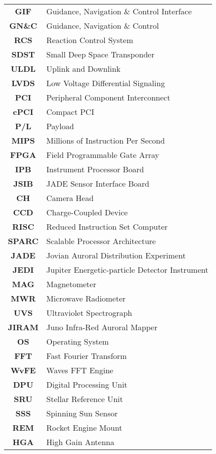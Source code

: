 \begin{multicols}{2}
{\begin{xltabular}{\linewidth}{c>{\raggedright\arraybackslash}X}
		\textbf{GIF} & Guidance, Navigation \& Control Interface \\
		\textbf{GN\&C} & Guidance, Navigation \& Control  \\
		\textbf{RCS} & Reaction Control System \\
		\textbf{SDST} & Small Deep Space Transponder \\
		\textbf{ULDL} & Uplink and Downlink \\
		\textbf{LVDS} & Low Voltage Differential Signaling \\
		\textbf{PCI} & Peripheral Component Interconnect \\
		\textbf{cPCI} & Compact PCI \\
		\textbf{P/L} & Payload \\
		\textbf{MIPS} & Millions of Instruction Per Second \\ 
		\textbf{FPGA} & Field Programmable Gate Array \\
		\textbf{IPB} & Instrument Processor Board \\
		\textbf{JSIB} & JADE Sensor Interface Board \\
		\textbf{CH} & Camera Head \\
		\textbf{CCD} & Charge-Coupled Device \\
		\textbf{RISC} & Reduced Instruction Set Computer \\
		\textbf{SPARC} & Scalable Processor Architecture \\
		\textbf{JADE} & Jovian Auroral Distribution Experiment \\
		\textbf{JEDI} & Jupiter Energetic-particle Detector Instrument \\
		\textbf{MAG} & Magnetometer \\
		\textbf{MWR} & Microwave Radiometer \\
		\textbf{UVS} & Ultraviolet Spectrograph \\
		\textbf{JIRAM} & Juno Infra-Red Auroral Mapper \\
		\textbf{OS} & Operating System \\
		\textbf{FFT} & Fast Fourier Transform \\
		\textbf{WvFE} & Waves FFT Engine \\
		\textbf{DPU} & Digital Processing Unit \\
		\textbf{SRU} & Stellar Reference Unit \\
		\textbf{SSS} & Spinning Sun Sensor \\
		\textbf{REM} & Rocket Engine Mount \\
		\textbf{HGA} & High Gain Antenna \\

\end{xltabular}}
\end{multicols}
